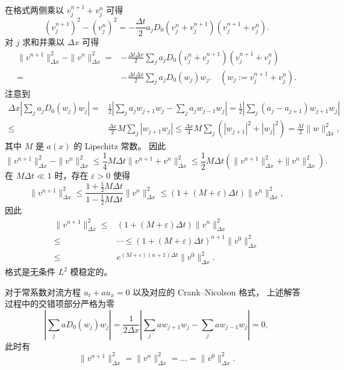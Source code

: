 \begin{solution*}
    在格式两侧乘以 $v_j^{n+1} + v_j^n$ 可得
    \[
        (v_j^{n+1})^2 - (v_j^n)^2 = - \frac{\Delta t}{2} a_j D_0(v_j^n + v_j^{n+1})(v_j^{n+1} + v_j^n).
    \]
    对 $j$ 求和并乘以 $\Delta x$ 可得
    \begin{align*}
        \|v^{n+1}\|_{\Delta x}^2 - \|v^{n}\|_{\Delta x}^2 ={}
            & - \frac{\Delta t \Delta x}{2} \sum_j a_j D_0(v_j^n + v_j^{n+1})(v_j^{n+1} + v_j^n)      \\
        ={} & - \frac{\Delta t \Delta x}{2} \sum_j a_j D_0(w_j) w_j. \quad (w_j := v_j^{n+1} + v_j^n).
    \end{align*}
    注意到
    \begin{align*}
        \Delta x \left| \sum_j a_j D_0(w_j) w_j \right|
        ={}   &
        \frac1{2} \left|
        \sum_j a_j w_{j+1} w_j - \sum_j a_j w_{j-1} w_j
        \right| =
        \frac1{2} \left|
        \sum_j (a_j-a_{j+1}) w_{j+1} w_j
        \right|
        \\
        \le{} & \frac{\Delta x}2 M
        \sum_j \left|w_{j+1} w_j\right|
        \le  \frac{\Delta x}4 M
        \sum_j \left(|w_{j+1}|^2 + |w_j|^2 \right)
        = \frac{M}{2} \|w\|_{\Delta x}^2,
    \end{align*}
    其中 $M$ 是 $a(x)$ 的 Lipschitz 常数。
    因此
    \[
        \|v^{n+1}\|_{\Delta x}^2 - \|v^{n}\|_{\Delta x}^2
        \le \frac{1}{4} M \Delta t \|v^{n+1} + v^n\|_{\Delta x}^2
        \le \frac{1}{2} M \Delta t \left( \|v^{n+1} \|_{\Delta x}^2 +  \|v^{n} \|_{\Delta x}^2\right).
    \]
    在 $M \Delta t \ll 1$ 时，存在 $\varepsilon > 0$ 使得
    \[
        \|v^{n+1}\|_{\Delta x}^2 \le
        \frac{1+\frac{1}{2} M \Delta t}{1-\frac{1}{2} M \Delta t} \|v^{n}\|_{\Delta x}^2
        \le (1 + (M+\varepsilon) \Delta t) \|v^{n}\|_{\Delta x}^2,
    \]
    因此
    \begin{align*}
        \|v^{n+1}\|_{\Delta x}^2 \le{} & (1 + (M+\varepsilon) \Delta t) \|v^{n}\|_{\Delta x}^2                  \\
        \le{}                          & \cdots \le (1 + (M+\varepsilon) \Delta t)^{n+1} \|v^{0}\|_{\Delta x}^2 \\
        \le{}                          & e^{(M+\varepsilon) (n+1)\Delta t} \|v^{0}\|_{\Delta x}^2.
    \end{align*}
    格式是无条件 $L^2$ 模稳定的。
\end{solution*}

\begin{remark}
    对于常系数对流方程 $u_t + a u_x = 0$ 以及对应的 Crank–Nicolson 格式，
    上述解答过程中的交错项部分严格为零
    \[
        \left| \sum_j a D_0(w_j) w_j \right|
        ={}
        \frac1{2\Delta x} \left|
        \sum_j a  w_{j+1} w_j - \sum_j a  w_{j-1} w_j
        \right| = 0,
    \]
    此时有
    \[
        \|v^{n+1}\|_{\Delta x}^2 = \|v^{n}\|_{\Delta x}^2 = \dots = \|v^{0}\|_{\Delta x}^2.
    \]
\end{remark}


